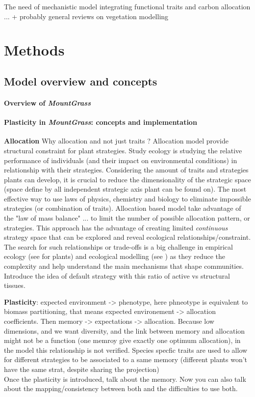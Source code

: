 \documentclass[review]{elsarticle}
\begin{document}
The need of mechanistic model integrating functional traits and carbon allocation ... \cite{marechaux_individual-based_2017} + probably general reviews on vegetation modelling

\section{Methods}
\subsection{Model overview and concepts}
\paragraph{Overview of \textit{MountGrass}}
\paragraph{Plasticity in \textit{MountGrass}:
 concepts and implementation}

\textbf{Allocation} Why allocation and not just traits ? Allocation model provide structural constraint for plant strategies. Study ecology is studying the relative performance of individuals (and their impact on environmental conditions) in relationship with their strategies. Considering the amount of traits and strategies plants can develop, it is crucial to reduce the dimensionality of the strategic space (space define by all independent strategic axis plant can be found on). The most effective way to use laws of physics, chemistry and biology to eliminate impossible strategies (or combination of traits). Allocation based model take advantage of the "law of mass balance" ... to limit the number of possible allocation pattern, or strategies. This approach has the advantage of creating limited \textit{continuous} strategy space that can be explored and reveal ecological relationships/constraint. The search for such relationships or trade-offs is a big challenge in empirical ecology (see \cite{reich_evolution_2003, wright_worldwide_2004, diaz_plant_2004, diaz_global_2016} for plants) and ecological modelling (see \cite{reineking_environmental_2006, falster_plant:_2016}) as they reduce the complexity and help understand the main mechanisms that shape communities.\\
Introduce the idea of default strategy with this ratio of active vs structural tissues.


\textbf{Plasticity}: expected environment -> phenotype, here phneotype is equivalent to biomass partitioning, that means expected environement -> allocation coefficients. Then memory -> expectations -> allocation. Because low dimensions, and we want diversity, and the link between memory and allocation might not be a function (one memroy give exactly one optimum allocation), in the model this relationship is not verified. Species specfic traits are used to allow for different strategies to be associated to a same memory (different plants won't have the same strat, despite sharing the projection)\\
Once the plasticity is introduced, talk about the memory. Now you can also talk about the mapping/consistency between both and the difficulties to use both.
\end{document}
